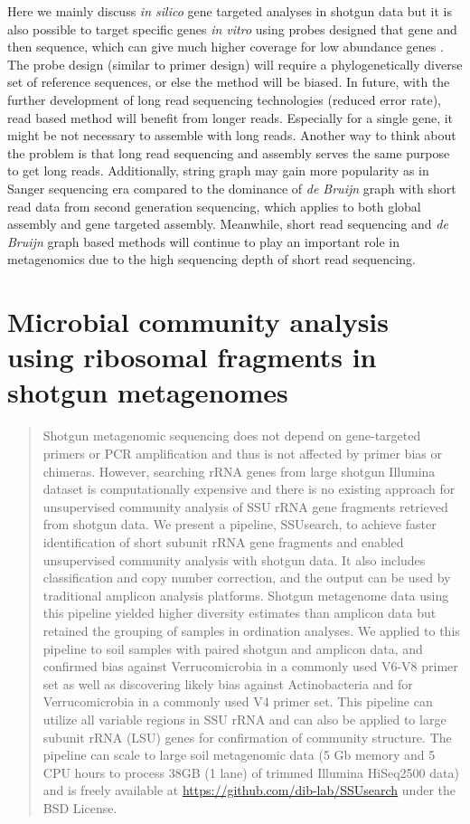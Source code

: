 \documentclass[]{msu-thesis}
\begin{document}
Here we mainly discuss \textit{in silico} gene targeted analyses in
shotgun data but it is also possible to target specific genes \textit{in
vitro} using probes designed that gene and then sequence, which can give
much higher coverage for low abundance genes
\cite{mercer_targeted_2014}. The probe design (similar to primer design)
will require a phylogenetically diverse set of reference sequences, or
else the method will be biased. In future, with the further development
of long read sequencing technologies (reduced error rate), read based
method will benefit from longer reads. Especially for a single gene, it
might be not necessary to assemble with long reads. Another way to think
about the problem is that long read sequencing and assembly serves the
same purpose to get long reads. Additionally, string graph may gain more
popularity as in Sanger sequencing era compared to the dominance of
\textit{de Bruijn} graph with short read data from second generation
sequencing, which applies to both global assembly and gene targeted
assembly. Meanwhile, short read sequencing and \textit{de Bruijn} graph
based methods will continue to play an important role in metagenomics
due to the high sequencing depth of short read sequencing.





\chapter{Microbial community analysis using ribosomal fragments in shotgun metagenomes}

\begin{abstract}
Shotgun metagenomic sequencing does not depend on gene-targeted primers or PCR amplification and thus is not affected by primer bias or chimeras. However, searching rRNA genes from large shotgun Illumina dataset is computationally expensive and there is no existing approach for unsupervised community analysis of SSU rRNA gene fragments retrieved from shotgun data. We present a pipeline, SSUsearch, to achieve faster identification of short subunit rRNA gene fragments and enabled unsupervised community analysis with shotgun data. It also includes classification and copy number correction, and the output can be used by traditional amplicon analysis platforms. Shotgun metagenome data using this pipeline yielded higher diversity estimates than amplicon data but retained the grouping of samples in ordination analyses. We applied to this pipeline to soil samples with paired shotgun and amplicon data, and confirmed bias against Verrucomicrobia in a commonly used V6-V8 primer set as well as discovering likely bias against Actinobacteria and for Verrucomicrobia in a commonly used V4 primer set. This pipeline can utilize all variable regions in SSU rRNA and can also be applied to large subunit rRNA (LSU) genes for confirmation of community structure. The pipeline can scale to large soil metagenomic data (5 Gb memory and 5 CPU hours to process 38GB (1 lane) of trimmed Illumina HiSeq2500 data) and is freely available at \url{https://github.com/dib-lab/SSUsearch} under the BSD License.
\end{abstract}
\end{document}
